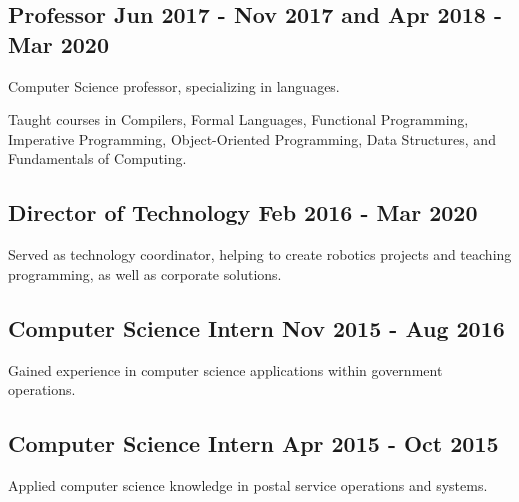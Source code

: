 \documentclass[letter,10pt]{article}
\begin{document}
\subsection{{Professor \hfill Jun 2017 - Nov 2017 and Apr 2018 - Mar 2020}}
\begin{zitemize}
\item Computer Science professor, specializing in languages.
\item Taught courses in Compilers, Formal Languages, Functional Programming, Imperative Programming, Object-Oriented Programming, Data Structures, and Fundamentals of Computing.
\end{zitemize}

\subsection{{Director of Technology \hfill Feb 2016 - Mar 2020}}
\begin{zitemize}
\item Served as technology coordinator, helping to create robotics projects and teaching programming, as well as corporate solutions.
\end{zitemize}

\subsection{{Computer Science Intern \hfill Nov 2015 - Aug 2016}}
\begin{zitemize}
\item Gained experience in computer science applications within government operations.
\end{zitemize}

\subsection{{Computer Science Intern \hfill Apr 2015 - Oct 2015}}
\begin{zitemize}
\item Applied computer science knowledge in postal service operations and systems.
\end{zitemize}
\end{document}
